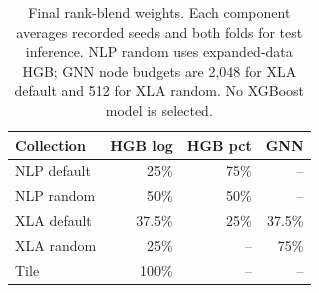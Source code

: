 \begin{table}[t]
\centering
\begin{tabular}{@{}lrrr@{}}
\toprule
Collection & HGB log & HGB pct & GNN \\
\midrule
NLP default & 25\% & 75\% & -- \\
NLP random & 50\% & 50\% & -- \\
XLA default & 37.5\% & 25\% & 37.5\% \\
XLA random & 25\% & -- & 75\% \\
Tile & 100\% & -- & -- \\
\bottomrule
\end{tabular}
\caption{Final rank-blend weights. Each component averages recorded seeds and both folds for test inference. NLP random uses expanded-data HGB; GNN node budgets are 2,048 for XLA default and 512 for XLA random. No XGBoost model is selected.}
\label{tab:recipe}
\end{table}
